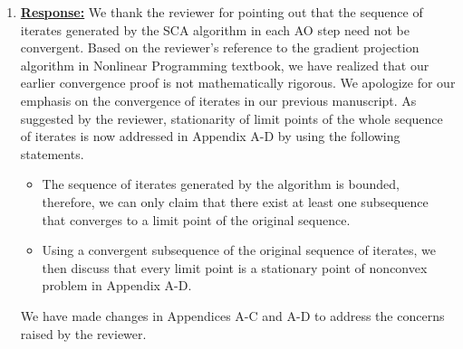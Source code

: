 \begin{enumerate}
	
	\item {}

	\vspace{1eM}
	\underline{\textbf{Response:}} We thank the reviewer for pointing out that the sequence of iterates generated by the \ac{SCA} algorithm in each \ac{AO} step need not be convergent. Based on the reviewer's reference to the gradient projection algorithm in Nonlinear Programming textbook, we have realized that our earlier convergence proof is not mathematically rigorous. We apologize for our emphasis on the convergence of iterates in our previous manuscript. As suggested by the reviewer, stationarity of limit points of the whole sequence of iterates is now addressed in Appendix A-D by using the following statements. 
	\begin{itemize}
		\item The sequence of iterates generated by the algorithm is bounded, therefore, we can only claim that there exist at least one subsequence that converges to a limit point of the original sequence.
		\item Using a convergent subsequence of the original sequence of iterates, we then discuss that every limit point is a stationary point of nonconvex problem in Appendix A-D.
	\end{itemize}
	
	We have made changes in Appendices A-C and A-D to address the concerns raised by the reviewer.
				

\end{enumerate}
